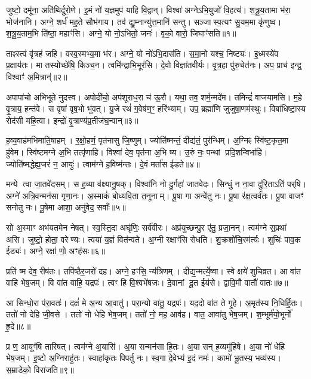 जुष्टो॒ दमू॑ना॒ अति॑थिर्दुरो॒णे।
इ॒मं नो॑ य॒ज्ञमुप॑ याहि वि॒द्वान्।
विश्वा॑ अग्ने\-ऽभि॒युजो॑ वि॒हत्य॑।
श॒त्रू॒य॒तामा भ॑रा॒ भोज॑नानि।
अग्ने॒ शर्ध॑ मह॒ते सौभ॑गाय।
तव॑ द्यु॒म्नान्यु॑त्त॒मानि॑ सन्तु।
सञ्जास्प॒त्यꣳ सु॒यम॒मा कृ॑णुष्व।
श॒त्रू॒य॒ताम॒भि ति॑ष्ठा॒ महाꣳ॑सि।
अग्ने॒ यो नो॒\-ऽभितो॒ जनः॑।
वृको॒ वारो॒ जिघाꣳ॑सति॥१॥

ताꣴस्त्वं वृ॑त्रहं जहि।
वस्व॒स्मभ्य॒मा भ॑र।
अग्ने॒ यो नो॑\-ऽभि॒दास॑ति।
स॒मा॒नो यश्च॒ निष्ट्यः॑।
इ॒ध्मस्ये॑व प्र॒क्षाय॑तः।
मा तस्योच्छे॑षि॒ किञ्च॒न।
त्वमि॑न्द्राभि॒भूर॑सि।
दे॒वो विज्ञा॑तवीर्यः।
वृ॒त्र॒हा पु॑रु॒चेत॑नः।
अप॒ प्राच॑ इन्द्र॒ विश्वाꣳ॑ अ॒मित्रान्॑॥२॥

अपापा॑चो अभिभूते नुदस्व।
अपोदी॑चो॒ अप॑शूराध॒रा च॑ ऊ॒रौ।
यथा॒ तव॒ शर्म॒न्मदे॑म।
तमिन्द्रं॑ वाजयामसि।
म॒हे वृ॒त्राय॒ हन्त॑वे।
स वृषा॑ वृष॒भो भु॑वत्।
यु॒जे रथं॑ ग॒वेष॑ण॒ꣳ॒ हरि॑भ्याम्।
उप॒ ब्रह्मा॑णि जुजुषा॒णम॑स्थुः।
विबा॑धिष्टा॒स्य रोद॑सी महि॒त्वा।
इन्द्रो॑ वृ॒त्राण्य॑प्र॒तीज॑घ॒न्वान्॥३॥

ह॒व्य॒वाह॑मभिमाति॒षाहम्।
र॒क्षो॒हणं॒ पृत॑नासु जि॒ष्णुम्।
ज्योति॑ष्मन्तं॒ दीद्य॑तं॒ पुर॑न्धिम्।
अ॒ग्निꣴ स्वि॑ष्ट॒कृत॒मा हु॑वेम।
स्वि॑ष्टमग्ने अ॒भि तत्पृ॑णाहि।
विश्वा॑ देव॒ पृत॑ना अ॒भि ष्य।
उ॒रुं नः॒ पन्थां प्रदि॒शन्विभा॑हि।
ज्योति॑ष्मद्धेह्य॒जरं॑ न॒ आयुः॑।
त्वाम॑ग्ने ह॒विष्म॑न्तः।
दे॒वं मर्ता॑स ईडते॥४॥

मन्ये त्वा जा॒तवे॑दसम्।
स ह॒व्या व॑क्ष्यानु॒षक्।
विश्वा॑नि नो दु॒र्गहा॑ जातवेदः।
सिन्धुं॒ न ना॒वा दु॑रि॒ताऽति॑ पर्‌\mbox{}षि।
अग्ने॑ अत्रि॒वन्मन॑सा गृणा॒नः।
अ॒स्माकं॑ बोध्यवि॒ता त॒नूनाम्।
पू॒षा गा अन्वे॑तु नः।
पू॒षा र॑क्ष॒त्वर्व॑तः।
पू॒षा वाजꣳ॑ सनोतु नः।
पू॒षेमा आशा॒ अनु॑वेद॒ सर्वाः᳚॥५॥

सो अ॒स्माꣳ अभ॑यतमेन नेषत्।
स्व॒स्ति॒दा अघृ॑णिः॒ सर्व॑वीरः।
अप्र॑युच्छन्पु॒र ए॑तु॒ प्रजा॒नन्।
त्वम॑ग्ने स॒प्रथा॑ असि।
जुष्टो॒ होता॒ वरेण्यः।
त्वया॑ य॒ज्ञं वित॑न्वते।
अ॒ग्नी रक्षाꣳ॑सि सेधति।
शु॒क्रशो॑चि॒रम॑र्त्यः।
शुचिः॑ पाव॒क ईड्यः॑।
अग्ने॒ रक्षा॑ णो॒ अꣳह॑सः॥६॥

प्रति॑ ष्म देव॒ रीष॑तः।
तपि॑ष्ठैर॒जरो॑ दह।
अग्ने॒ हꣳसि॒ न्य॑त्रिणम्।
दीद्य॒न्मर्त्ये॒ष्वा।
स्वे क्षये॑ शुचिव्रत।
आ वा॑त वाहि भेष॒जम्।
वि वा॑त वाहि॒ यद्रपः॑।
त्वꣳ हि वि॒श्वभे॑षजः।
दे॒वानां दू॒त ईय॑से।
द्वावि॒मौ वातौ॑ वातः॥७॥

आ सिन्धो॒रा प॑रा॒वतः॑।
दक्षं॑ मे अ॒न्य आ॒वातु॑।
परा॒न्यो वा॑तु॒ यद्रपः॑।
यद॒दो वा॑त ते गृ॒हे।
अ॒मृत॑स्य नि॒धिर्\mbox{}हि॒तः।
ततो॑ नो देहि जी॒वसे।
ततो॑ नो धेहि भेष॒जम्।
ततो॑ नो॒ मह॒ आव॑ह।
वात॒ आवा॑तु भेष॒जम्।
श॒म्भूर्म॑यो॒भूर्नो॑ हृ॒दे॥८॥

प्र ण॒ आयूꣳ॑षि तारिषत्।
त्वम॑ग्ने अ॒यासि॑।
अ॒या सन्मन॑सा हि॒तः।
अ॒या सन् ह॒व्यमू॑हिषे।
अ॒या नो॑ धेहि भेष॒जम्।
इ॒ष्टो अ॒ग्निराहु॑तः।
स्वाहा॑कृतः पिपर्तु नः।
स्व॒गा दे॒वेभ्य॑ इ॒दं नमः॑।
कामो॑ भू॒तस्य॒ भव्य॑स्य।
स॒म्राडेको॒ विरा॑जति॥९॥

